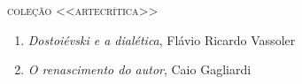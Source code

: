 \medskip
{\large\textsc{coleção <<artecrítica>>}}

\begin{enumerate}
\setlength\parskip{4.2pt}
\setlength\itemsep{-1.4mm}
\item \textit{Dostoiévski e a dialética}, Flávio Ricardo Vassoler
\item \textit{O renascimento do autor}, Caio Gagliardi
\end{enumerate}

\endgroup

\pagebreak
\ifodd\thepage\paginabranca\else\clearpage\fi
